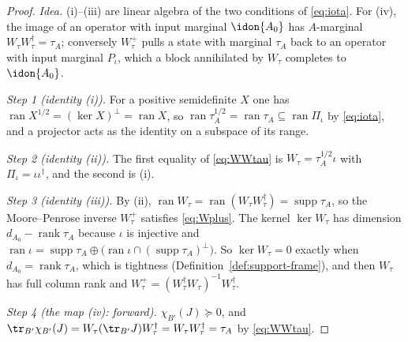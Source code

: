 \begin{proof}
\emph{Idea.} (i)--(iii) are linear algebra of the two conditions of
\eqref{eq:iota}. For (iv), the image of an operator with input marginal
$\idon{A_0}$ has $A$-marginal $W_{\tau}W_{\tau}^{\dagger}=\tau_A$;
conversely $W_{\tau}^{+}$ pulls a state with marginal $\tau_A$ back to an
operator with input marginal $P_{\iota}$, which a block annihilated by
$W_{\tau}$ completes to $\idon{A_0}$.

\emph{Step 1 (identity (i)).} For a positive semidefinite $X$ one has
$\operatorname{ran}X^{1/2}=(\ker X)^{\perp}=\operatorname{ran}X$, so
$\operatorname{ran}\tau_A^{1/2}=\operatorname{ran}\tau_A
\subseteq\operatorname{ran}\Pi_{\iota}$ by \eqref{eq:iota}, and a
projector acts as the identity on a subspace of its range.

\emph{Step 2 (identity (ii)).} The first equality of \eqref{eq:WWtau} is
$W_{\tau}=\tau_A^{1/2}\iota$ with $\Pi_{\iota}=\iota\iota^{\dagger}$, and
the second is (i).

\emph{Step 3 (identity (iii)).} By (ii),
$\operatorname{ran}W_{\tau}
=\operatorname{ran}(W_{\tau}W_{\tau}^{\dagger})
=\operatorname{supp}\tau_A$, so the Moore--Penrose inverse $W_{\tau}^{+}$
satisfies \eqref{eq:Wplus}. The kernel $\ker W_{\tau}$ has dimension
$d_{A_0}-\operatorname{rank}\tau_A$ because $\iota$ is injective and
$\operatorname{ran}\iota=\operatorname{supp}\tau_A\oplus
\big(\operatorname{ran}\iota\cap(\operatorname{supp}\tau_A)^{\perp}\big)$.
So $\ker W_{\tau}=0$ exactly when $d_{A_0}=\operatorname{rank}\tau_A$,
which is tightness (Definition~\ref{def:support-frame}), and then
$W_{\tau}$ has full column rank and
$W_{\tau}^{+}=(W_{\tau}^{\dagger}W_{\tau})^{-1}W_{\tau}^{\dagger}$.

\emph{Step 4 (the map (iv): forward).} $\chi_{B'}(J)\succeq0$, and
$\tr_{B'}\chi_{B'}(J)=W_{\tau}(\tr_{B'}J)W_{\tau}^{\dagger}
=W_{\tau}W_{\tau}^{\dagger}=\tau_A$ by \eqref{eq:WWtau}.


\end{proof}

